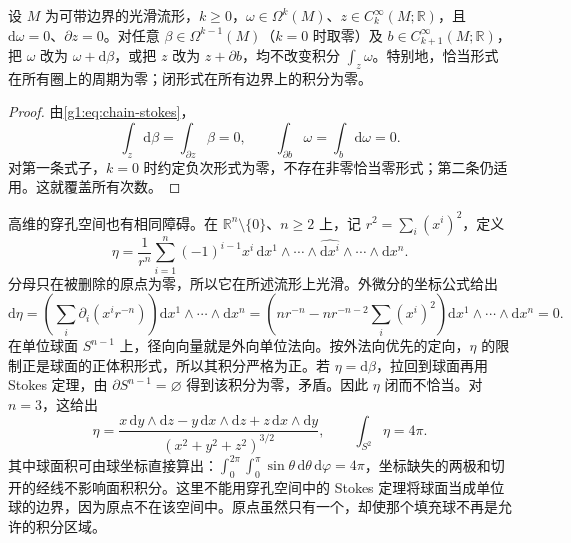 \begin{proposition}
	\label{g1:prop:period-pairing}
	设 \(M\) 为可带边界的光滑流形，\(k\ge0\)，\(\omega\in\Omega^k(M)\)、\(z\in C_k^\infty(M;\mathbb R)\)，且 \(\mathrm{d}\omega=0\)、\(\partial z=0\)。对任意 \(\beta\in\Omega^{k-1}(M)\)（\(k=0\) 时取零）及 \(b\in C_{k+1}^\infty(M;\mathbb R)\)，把 \(\omega\) 改为 \(\omega+\mathrm{d}\beta\)，或把 \(z\) 改为 \(z+\partial b\)，均不改变积分 \(\int_z\omega\)。特别地，恰当形式在所有圈上的周期为零；闭形式在所有边界上的积分为零。
\end{proposition}
\begin{proof}
	由\eqref{g1:eq:chain-stokes}，
	\[
		\int_z\mathrm{d}\beta=\int_{\partial z}\beta=0,
		\qquad
		\int_{\partial b}\omega=\int_b\mathrm{d}\omega=0.
	\]
	对第一条式子，\(k=0\) 时约定负次形式为零，不存在非零恰当零形式；第二条仍适用。这就覆盖所有次数。
\end{proof}

高维的穿孔空间也有相同障碍。在 \(\mathbb R^n\setminus\{0\}\)、\(n\geq2\) 上，记 \(r^2=\sum_i(x^i)^2\)，定义
\begin{equation}\label{g1:eq:radial-period-form}
	\eta=\frac1{r^n}\sum_{i=1}^n(-1)^{i-1}x^i\,
	\mathrm{d}x^1\wedge\cdots\wedge\widehat{\mathrm{d}x^i}\wedge\cdots\wedge\mathrm{d}x^n.
\end{equation}
分母只在被删除的原点为零，所以它在所述流形上光滑。外微分的坐标公式给出
\[
	\mathrm{d}\eta
	=\left(\sum_i\partial_i(x^i r^{-n})\right)\mathrm{d}x^1\wedge\cdots\wedge\mathrm{d}x^n
	=\left(nr^{-n}-nr^{-n-2}\sum_i(x^i)^2\right)\mathrm{d}x^1\wedge\cdots\wedge\mathrm{d}x^n=0.
\]
在单位球面 \(S^{n-1}\) 上，径向向量就是外向单位法向。按外法向优先的定向，\(\eta\) 的限制正是球面的正体积形式，所以其积分严格为正。若 \(\eta=\mathrm{d}\beta\)，拉回到球面再用 Stokes 定理，由 \(\partial S^{n-1}=\varnothing\) 得到该积分为零，矛盾。因此 \(\eta\) 闭而不恰当。对 \(n=3\)，这给出
\[
	\eta=\frac{x\,\mathrm{d}y\wedge\mathrm{d}z-y\,\mathrm{d}x\wedge\mathrm{d}z+z\,\mathrm{d}x\wedge\mathrm{d}y}{(x^2+y^2+z^2)^{3/2}},
	\qquad \int_{S^2}\eta=4\pi.
\]
其中球面积可由球坐标直接算出：\(\int_0^{2\pi}\int_0^\pi\sin\theta\,\mathrm{d}\theta\,\mathrm{d}\varphi=4\pi\)，坐标缺失的两极和切开的经线不影响面积积分。这里不能用穿孔空间中的 Stokes 定理将球面当成单位球的边界，因为原点不在该空间中。原点虽然只有一个，却使那个填充球不再是允许的积分区域。

\ProseParagraphBreak


